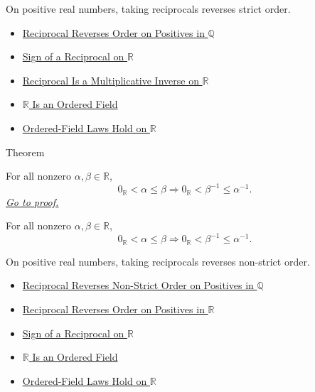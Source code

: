 \begin{remark*}[Interpretation]
On positive real numbers, taking reciprocals reverses strict order.
\end{remark*}

\begin{dependencies}
\begin{itemize}
  \item \hyperref[thm:reciprocal-reverses-order-on-positives-q]{Reciprocal Reverses Order on Positives in $\mathbb{Q}$}
  \item \hyperref[thm:sign-of-reciprocal-r]{Sign of a Reciprocal on $\mathbb{R}$}
  \item \hyperref[thm:reciprocal-multiplicative-inverse-on-r]{Reciprocal Is a Multiplicative Inverse on $\mathbb{R}$}
  \item \hyperref[thm:r-is-an-ordered-field]{$\mathbb{R}$ Is an Ordered Field}
  \item \hyperref[cor:ordered-field-laws-on-r]{Ordered-Field Laws Hold on $\mathbb{R}$}
\end{itemize}
\end{dependencies}

\begin{theorembox}{Theorem}
\begin{theorem}
\label{thm:reciprocal-reverses-nonstrict-order-on-positives-r}
For all nonzero $\alpha,\beta\in\mathbb{R}$,
\[
0_{\mathbb{R}}<\alpha\le\beta
\Longrightarrow
0_{\mathbb{R}}<\beta^{-1}\le\alpha^{-1}.
\]
\hyperref[prf:reciprocal-reverses-nonstrict-order-on-positives-r]{\textit{Go to proof.}}
\end{theorem}
\end{theorembox}

\begin{remark*}
For all nonzero $\alpha,\beta\in\mathbb{R}$,
\[
0_{\mathbb{R}}<\alpha\le\beta
\Longrightarrow
0_{\mathbb{R}}<\beta^{-1}\le\alpha^{-1}.
\]
\end{remark*}

\begin{remark*}[Interpretation]
On positive real numbers, taking reciprocals reverses non-strict order.
\end{remark*}

\begin{dependencies}
\begin{itemize}
  \item \hyperref[thm:reciprocal-reverses-nonstrict-order-on-positives-q]{Reciprocal Reverses Non-Strict Order on Positives in $\mathbb{Q}$}
  \item \hyperref[thm:reciprocal-reverses-order-on-positives-r]{Reciprocal Reverses Order on Positives in $\mathbb{R}$}
  \item \hyperref[thm:sign-of-reciprocal-r]{Sign of a Reciprocal on $\mathbb{R}$}
  \item \hyperref[thm:r-is-an-ordered-field]{$\mathbb{R}$ Is an Ordered Field}
  \item \hyperref[cor:ordered-field-laws-on-r]{Ordered-Field Laws Hold on $\mathbb{R}$}
\end{itemize}
\end{dependencies}

